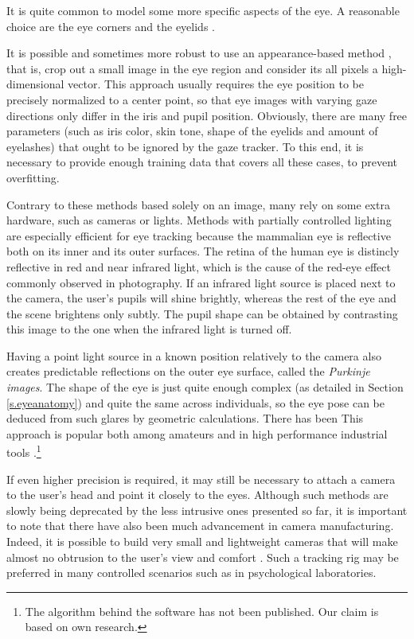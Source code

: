 It is quite common to model some more specific aspects of the eye.
A reasonable choice are the eye corners \cite{zhu12} and the eyelids \cite{yuille92}.

It is possible and sometimes more robust to use an appearance-based method \cite{tan02}, that is, crop out a small image in the eye region and consider its all pixels a high-dimensional vector.
This approach usually requires the eye position to be precisely normalized to a center point, so that eye images with varying gaze directions only differ in the iris and pupil position.
Obviously, there are many free parameters (such as iris color, skin tone, shape of the eyelids and amount of eyelashes) that ought to be ignored by the gaze tracker.
To this end, it is necessary to provide enough training data that covers all these cases, to prevent overfitting.

Contrary to these methods based solely on an image, many rely on some extra hardware, such as cameras or lights.
Methods with partially controlled lighting are especially efficient for eye tracking because the mammalian eye is reflective both on its inner and its outer surfaces.
The retina of the human eye is distincly reflective in red and near infrared light, which is the cause of the red-eye effect commonly observed in photography.
If an infrared light source is placed next to the camera, the user's pupils will shine brightly, whereas the rest of the eye and the scene brightens only subtly.
The pupil shape can be obtained by contrasting this image to the one when the infrared light is turned off.

Having a point light source in a known position relatively to the camera also creates predictable reflections on the outer eye surface, called the \textit{Purkinje images}.
The shape of the eye is just quite enough complex (as detailed in Section \ref{s.eyeanatomy}) and quite the same across individuals, so the eye pose can be deduced from such glares by geometric calculations.
There has been \todo{\dots}\cite{villanueva08}
This approach is popular both among amateurs \cite{yucel09,wolski16} and in high performance industrial tools \cite{tobii}.\footnote{
The algorithm behind the software \cite{tobii} has not been published.
Our claim is based on own research.
}

If even higher precision is required, it may still be necessary to attach a camera to the user's head and point it closely to the eyes.
Although such methods are slowly being deprecated by the less intrusive ones presented so far, it is important to note that there have also been much advancement in camera manufacturing.
Indeed, it is possible to build very small and lightweight cameras that will make almost no obtrusion to the user's view and comfort \cite{pupil,kassner14}.
Such a tracking rig may be preferred in many controlled scenarios such as in psychological laboratories.

